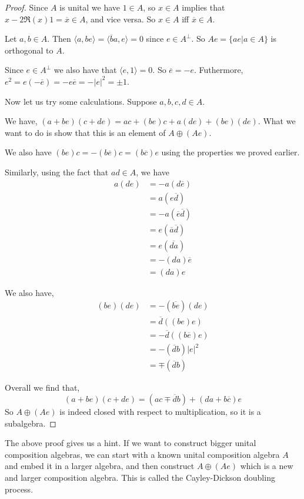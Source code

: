 \begin{proof}
    Since $A$ is unital we have $1\in A$, so $x \in A$ implies that $x-2\Re(x)1 = \overline{x}\in A$, and vice versa. So $x\in A$ iff $\overline{x}\in A$. 
    
    Let $a,b\in A$. Then $\langle a,be\rangle = \langle \overline{b}a,e\rangle =0$ since $e\in A^\perp$. So $Ae = \{ae|a\in A\}$ is orthogonal to $A$.

    Since $e\in A^\perp$ we also have that $\langle e,1\rangle = 0$. So $\overline{e}=-e$. Futhermore, $e^2 = e(-\overline{e}) = -e\overline{e} = -|e|^2 = \pm 1$.

    Now let us try some calculations. Suppose $a,b,c,d\in A$.
    
    We have, $(a+be)(c+de) = ac+(be)c+a(de)+(be)(de)$. What we want to do is show that this is an element of $A\oplus (Ae)$.

    We also have $(be)c=-(b\overline{e})c=(b\overline{c})e$ using the properties we proved earlier.

    Similarly, using the fact that $ad \in A$, we have 
    \begin{align*}a(de)&=-a(d\overline{e}) \\&= a(e\overline{d})\\& = -a(\overline{e}\overline{d}) \\&= e(\overline{a}\overline{d})\\&=e(\overline{da}) \\&= -(da)\overline{e} \\&= (da)e\end{align*}

    We also have,
    \begin{align*}
        (be)(de)&= -(\overline{be})(de)\\
        &= \overline{d}((be)e)\\
        &= -\overline{d}((b\overline{e})e)\\
        &= -(\overline{d}b)|e|^2\\& = \mp (\overline{d}b)
    \end{align*}

    Overall we find that,
    \[(a+be)(c+de) = (ac\mp \overline{d}b) + (da+b\overline{c})e \]
    So $A\oplus(Ae)$ is indeed closed with respect to multiplication, so it is a subalgebra.
\end{proof}
The above proof gives us a hint. If we want to construct bigger unital composition algebras, we can start with a known unital composition algebra $A$ and embed it in a larger algebra, and then construct $A\oplus (Ae)$ which is a new and larger composition algebra. This is called the Cayley-Dickson doubling process.
